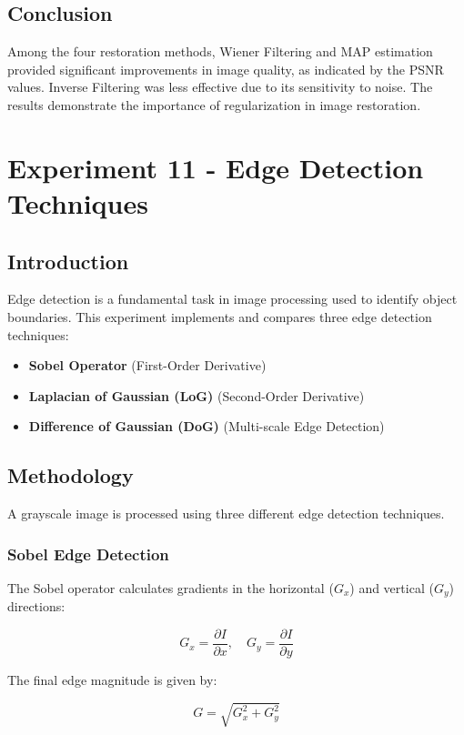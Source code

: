 \documentclass{report}
\begin{document}
\section{Conclusion}
Among the four restoration methods, Wiener Filtering and MAP estimation provided significant improvements in image quality, as indicated by the PSNR values. Inverse Filtering was less effective due to its sensitivity to noise. The results demonstrate the importance of regularization in image restoration.

\chapter{Experiment 11 - Edge Detection Techniques}

\section{Introduction}
Edge detection is a fundamental task in image processing used to identify object boundaries. This experiment implements and compares three edge detection techniques:
\begin{itemize}
    \item \textbf{Sobel Operator} (First-Order Derivative)
    \item \textbf{Laplacian of Gaussian (LoG)} (Second-Order Derivative)
    \item \textbf{Difference of Gaussian (DoG)} (Multi-scale Edge Detection)
\end{itemize}

\section{Methodology}
A grayscale image is processed using three different edge detection techniques.

\subsection{Sobel Edge Detection}
The Sobel operator calculates gradients in the horizontal ($G_x$) and vertical ($G_y$) directions:

\begin{equation}
G_x = \frac{\partial I}{\partial x}, \quad G_y = \frac{\partial I}{\partial y}
\end{equation}

The final edge magnitude is given by:

\begin{equation}
G = \sqrt{G_x^2 + G_y^2}
\end{equation}
\end{document}
